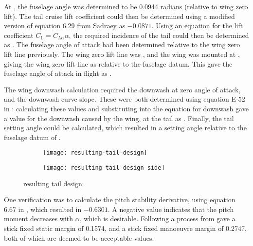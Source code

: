 \documentclass[../../main.tex]{subfiles}
\begin{document}
At , the fuselage angle was determined to be 0.0944 radians (relative to wing zero lift).
The tail cruise lift coefficient could then be determined using a modified version of equation 6.29 from Sadraey \cite{sadraey-13} as $-0.0871$.
Using an equation for the lift coefficient $C_\mathrm{L} = C_{L\alpha}\alpha$, the required incidence of the tail could then be determined as .  %
The fuselage angle of attack had been determined relative to the wing zero lift line previously.
The wing zero lift line was , and the wing was mounted at , giving the wing zero lift line as  relative to the fuselage datum.
This gave the fuselage angle of attack in flight as .  

The wing downwash calculation required the downwash at zero angle of attack, and the downwash curve slope.
These were both determined using equation E-52 in \cite{torenbeek-76}: calculating these values and substituting into the equation for downwash gave a value for the downwash caused by the wing, at the tail as .
Finally, the tail setting angle could be calculated, which resulted in a setting angle relative to the fuselage datum of . 


\begin{figure}[H]

    \centering
    \begin{subfigure}[b]{0.49\columnwidth}
        \centering
        \texttt{[image: resulting-tail-design]}
        \caption{}
        \label{fig:final-tail-design:angle}
    \end{subfigure}
    \hfill
    \begin{subfigure}[b]{0.49\columnwidth}
        \centering
        \texttt{[image: resulting-tail-design-side]}
        \caption{}
        \label{fig:final-tail-design:side}
    \end{subfigure}
    
    \caption{resulting tail design.}
    \label{fig:final-tail-design}
\end{figure} 

One verification was to calculate the pitch stability derivative, using equation 6.67 in \cite{sadraey-13}, which resulted in $-0.6301$.
A negative value indicates that the pitch moment decreases with $\alpha$, which is desirable.
Following a process from \cite{de-kat-17} gave a stick fixed static margin of 0.1574, and a stick fixed manoeuvre margin of 0.2747, both of which are deemed to be acceptable values. 
\end{document}
